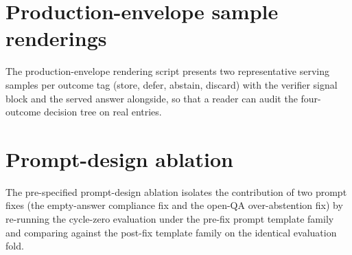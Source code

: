 

\section{Production-envelope sample renderings}
\label{app:production-envelope}

The production-envelope rendering script presents two representative serving samples per outcome tag (store, defer, abstain, discard) with the verifier signal block and the served answer alongside, so that a reader can audit the four-outcome decision tree on real entries.



\section{Prompt-design ablation}
\label{app:prompt-design-ablation}

The pre-specified prompt-design ablation isolates the contribution of two prompt fixes (the empty-answer compliance fix and the open-QA over-abstention fix) by re-running the cycle-zero evaluation under the pre-fix prompt template family and comparing against the post-fix template family on the identical evaluation fold.


